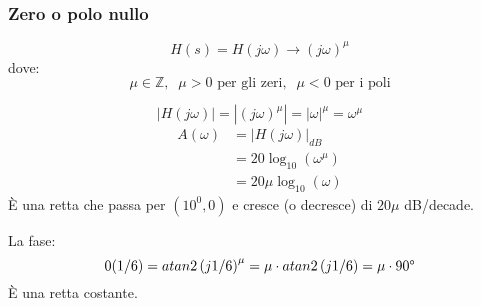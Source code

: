 \documentclass[a4paper]{article}
\begin{document}
\subsubsection{Zero o polo nullo}
\[
  H(s) = H(j \omega) \to  \left( j \omega \right)^{\mu}
\] 
dove:
\[
  \mu \in \mathbb{Z}, \;\; \mu > 0 \text{ per gli zeri},\;\; \mu < 0 \text{ per i poli} 
\] 
\begin{figure}[H]
  \centering
\end{figure}
\noindent
\begin{definition}
  \[
    \left| H(j \omega) \right| = \left| \left( j \omega \right)^{\mu} \right| = \left| \omega \right|^{\mu} = \omega^{\mu}
  \] 
  \[
    \begin{aligned}
      A(\omega) &= \left| H(j \omega) \right|_{dB}\\
                &= 20 \log_{10} \left( \omega^{\mu} \right)\\
                &= 20 \mu \log_{10} \left( \omega \right)
    \end{aligned}
  \] 
  È una retta che passa per \( \left( 10^0,0 \right) \) e cresce (o decresce) di
  \( 20 \mu \) dB/decade.

  \noindent
  La fase:
  \[
    0(1/6) = atan2\left( j 1/6 \right)^{\mu} = \mu \cdot atan2\left( j 1/6 \right) = \mu \cdot 90\degree
  \] 
  È una retta costante.
\end{definition}
\end{document}
